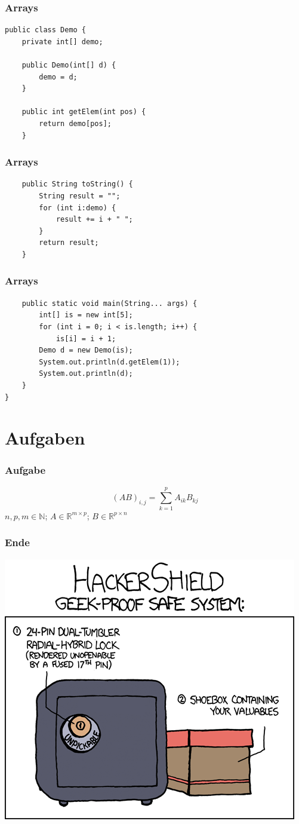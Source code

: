 \documentclass{beamer}
\begin{document}
\begin{frame}[fragile]
\frametitle{Arrays}
\begin{verbatim}
public class Demo {
    private int[] demo;

    public Demo(int[] d) {
        demo = d;
    }

    public int getElem(int pos) {
        return demo[pos];
    }
\end{verbatim}
\end{frame}

\begin{frame}[fragile]
\frametitle{Arrays}
\begin{verbatim}
    public String toString() {
        String result = "";
        for (int i:demo) {
            result += i + " ";
        }
        return result;
    }
\end{verbatim}
\end{frame}

\begin{frame}[fragile]
\frametitle{Arrays}
\begin{verbatim}
    public static void main(String... args) {
        int[] is = new int[5];
        for (int i = 0; i < is.length; i++) {
            is[i] = i + 1;
        Demo d = new Demo(is);
        System.out.println(d.getElem(1));
        System.out.println(d);
    }
}
\end{verbatim}
\end{frame}

\section{Aufgaben}
\begin{frame}
\frametitle{Aufgabe}
$$(AB)_{i,j}=\sum^{p}_{k=1}A_{ik}B_{kj}$$
$n,p,m\in\mathbb{N}$; $A\in{}\mathbb{R}^{m\times{}p}$;
$B\in\mathbb{R}^{p\times{}n}$
\end{frame}

\begin{frame}
\frametitle{Ende}
\includegraphics[scale=0.4]{unpickable-1.png}
\end{frame}
\end{document}
